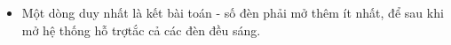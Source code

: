 \begin{itemize}
	\item Một dòng duy nhất là kết bài toán - số đèn phải mở thêm ít nhất, để sau khi mở hệ thống hỗ trợtắc cả các đèn đều sáng.
\end{itemize}